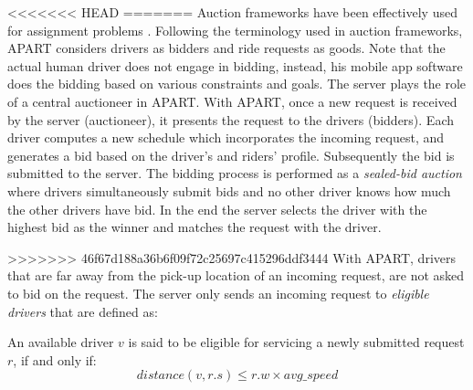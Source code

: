 <<<<<<< HEAD
=======
Auction frameworks have been effectively used for assignment problems \cite{Lagoudakis04,Mehta05}. Following the terminology used in auction frameworks, APART considers drivers as bidders and ride requests as goods. Note that the actual human driver does not engage in bidding, instead, his mobile app software does the bidding based on various constraints and goals. The server plays the role of a central auctioneer in APART. With APART, once a new request is received by the server (auctioneer), it presents the request to the drivers (bidders). Each driver computes a new schedule which incorporates the incoming request, and generates a bid based on the driver's and riders' profile. Subsequently the bid is submitted to the server. The bidding process is performed as a \textit{sealed-bid auction} where drivers simultaneously submit bids and no other driver knows how much the other drivers have bid. In the end the server selects the driver with the highest bid as the winner and matches the request with the driver.

>>>>>>> 46f67d188a36b6f09f72c25697c415296ddf3444
With APART, drivers that are far away from the pick-up location of an incoming request, are not asked to bid on the request. The server only sends an incoming request to \textit{eligible drivers} that are defined as:

\begin{definition} 
An available driver $v$ is said to be eligible for servicing a newly submitted request $r$, if and only if:
\vspace{-2mm}
\begin{equation*}
distance(v, r.s) \leq r.w \times avg\_speed
\end{equation*}
\end{definition}

